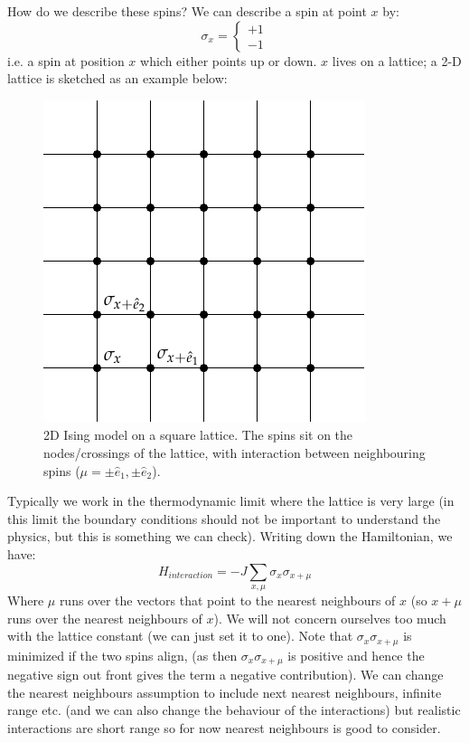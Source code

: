How do we describe these spins? We can describe a spin at point $x$ by:
\begin{equation}
    \sigma_x = \begin{cases}
        +1 \\ -1
    \end{cases}
\end{equation}
i.e. a spin at position $x$ which either points up or down. $x$ lives on a lattice; a 2-D lattice is sketched as an example below:

\begin{figure}[htbp]
    \centering
    \includegraphics[]{Images/fig-2DIsing.pdf}
    
    \caption{2D Ising model on a square lattice. The spins sit on the nodes/crossings of the lattice, with interaction between neighbouring spins ($\mu = \pm \hat{e}_1, \pm \hat{e}_2$).}
    \label{fig-2DIsing}
\end{figure}

Typically we work in the thermodynamic limit where the lattice is very large (in this limit the boundary conditions should not be important to understand the physics, but this is something we can check). Writing down the Hamiltonian, we have:
\begin{equation}
    H_{interaction} = -J \sum_{x, \mu}\sigma_{x}\sigma_{x+\mu}
\end{equation}
Where $\mu$ runs over the vectors that point to the nearest neighbours of $x$ (so $x + \mu$ runs over the nearest neighbours of $x$). We will not concern ourselves too much with the lattice constant (we can just set it to one). Note that $\sigma_x\sigma_{x+\mu}$ is minimized if the two spins align, (as then $\sigma_x\sigma_{x+\mu}$ is positive and hence the negative sign out front gives the term a negative contribution). We can change the nearest neighbours assumption to include next nearest neighbours, infinite range etc. (and we can also change the behaviour of the interactions) but realistic interactions are short range so for now nearest neighbours is good to consider.

